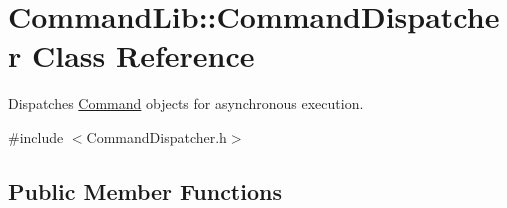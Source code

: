 \hypertarget{class_command_lib_1_1_command_dispatcher}{}\section{Command\+Lib\+:\+:Command\+Dispatcher Class Reference}
\label{class_command_lib_1_1_command_dispatcher}


Dispatches \mbox{\hyperlink{class_command_lib_1_1_command}{Command}} objects for asynchronous execution.  




{\ttfamily \#include $<$Command\+Dispatcher.\+h$>$}

\subsection*{Public Member Functions}
